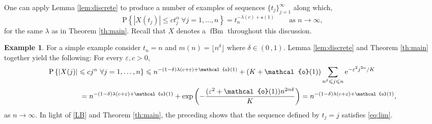 \documentclass[reqno]{amsart}
\DeclareMathOperator{\fBm}{fBm}
\newcommand{\<}{\langle}
\renewcommand{\>}{\rangle}
\renewcommand{\P}{\mathrm{P}}
\newcommand{\1}{\mathbb{1}}
\newcommand{\e}{{\rm e}}
\renewcommand{\le}{\leqslant}
\theoremstyle{definition}
\newtheorem{example}[stat]{Example}
\numberwithin{equation}{section}
\begin{document}
One can apply Lemma \ref{lem:discrete} to produce a number of examples
of sequences $\{t_j\}_{j=1}^\infty$ along which,
\begin{equation}\label{eq:lim}
	\P\left\{ |X(t_j)|\le  ct_j^\alpha\ \forall j=1,\ldots,n\right\}
	= t_n^{-\lambda(c)+\mathcal{o}(1)}\qquad\text{as $n\to\infty$},
\end{equation}
for the same $\lambda$ as in Theorem \ref{th:main}. Recall that $X$ denotes a
$\fBm$ throughout this discussion.

\begin{example}
	For a simple example consider $t_n=n$ and $m(n)=\lfloor n^\delta\rfloor$
	where $\delta\in(0\,,1)$. Lemma \ref{lem:discrete} and Theorem \ref{th:main}
	together yield the following: For every $\varepsilon,c>0$,
	\begin{align*}
		&\P\left\{ |X(j)|\le  cj^\alpha\ \forall j=1,\ldots,n\right\}
			\le n^{-(1-\delta)\lambda(c+\varepsilon)+\mathcal{o}(1)}
			+ (K+\mathcal{o}(1))
			\sum_{n^\delta\le j\le n} \e^{-\varepsilon^2j^{2\alpha}/K}\\
		&\hskip0.6in
			=	n^{-(1-\delta)\lambda(c+\varepsilon)+\mathcal{o}(1)}
			+ \exp\left(-\frac{(\varepsilon^2+\mathcal{o}(1))n^{2\alpha\delta}}{K}
			\right)=	n^{-(1-\delta)\lambda(c+\varepsilon)+\mathcal{o}(1)},
	\end{align*}
	as $n\to\infty$. In light of \eqref{LB} and Theorem \ref{th:main},
	the preceding shows that the sequence defined by $t_j=j$
	satisfies \eqref{eq:lim}.
\end{example}
\end{document}
